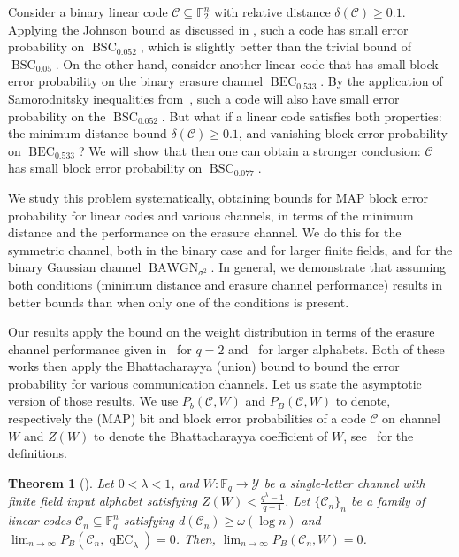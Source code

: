 \documentclass{article}
\DeclareMathOperator{\qEC}{qEC}
\DeclareMathOperator{\BEC}{BEC}
\DeclareMathOperator{\BSC}{BSC}
\DeclareMathOperator{\BAWGN}{BAWGN}
\newcommand{\cC}{\mathcal{C}}
\theoremstyle{plain}
\theoremstyle{plain}
\newtheorem{theorem}[definition]{Theorem}%
\theoremstyle{plain}
\theoremstyle{plain}
\theoremstyle{plain}
\theoremstyle{plain}
\theoremstyle{plain}
\theoremstyle{plain}
\theoremstyle{plain}
\theoremstyle{plain}
\theoremstyle{remark}
\theoremstyle{remark}
\theoremstyle{remark}
\theoremstyle{plain}
\begin{document}
Consider a binary linear code
$\mathcal{C}\subseteq\mathbb{F}_2^n$ with
relative distance $\delta(\mathcal{C})\ge 0.1$.
Applying the Johnson bound as discussed in ,
such a code has small error probability on
$\BSC_{0.052}$, which is slightly better than
the trivial bound of $\BSC_{0.05}$.
On the other hand, consider another linear code that has
small block error probability on the binary erasure
channel
$\BEC_{0.533}$. By the application of
Samorodnitsky inequalities from~\cite{hkazla2021codes}, such a code
will also have small error probability
on the $\BSC_{0.052}$.
But what if a linear code satisfies both properties: the minimum distance bound
$\delta(\mathcal{C})\ge 0.1$, and
vanishing block error probability on $\BEC_{0.533}$?
We will show that then one can obtain a stronger
conclusion: $\mathcal{C}$ has small block error
probability on $\BSC_{0.077}$.

We study this problem systematically, obtaining bounds
for MAP block error probability for linear codes
and various channels,
in terms of the minimum distance and the performance on the
erasure channel. We do this for the symmetric channel,
both in the binary case and for larger finite fields,
and for the binary Gaussian channel $\BAWGN_{\sigma^2}$.
In general, we demonstrate that assuming
both conditions
(minimum distance and erasure channel performance) results in
better bounds than when only one of the conditions is present.

Our results apply the bound on the weight
distribution in terms of the erasure channel performance given in~\cite{hkazla2021codes} for $q=2$ and~\cite{abawonse2025generalized} for larger alphabets.
Both of these works then apply the Bhattacharayya (union) bound
to bound the error probability for various communication channels. Let us state the asymptotic version of those
results. 
We use $P_b(\cC,W)$ and $P_B(\cC,W)$ 
to denote, respectively the (MAP) bit and block error
probabilities of a code $\cC$ on channel $W$
and $Z(W)$ to denote the Bhattacharayya coefficient of $W$, see~ for the definitions.
\begin{theorem}[\cite{hkazla2021codes,abawonse2025generalized}]
\label{thm:original}
Let $0<\lambda< 1$, and $W:\mathbb{F}_q\to\mathcal{Y}$ be
a single-letter channel with finite field input alphabet satisfying
$Z(W)<\frac{q^{\lambda}-1}{q-1}$. Let
$\{\cC_n\}_n$ be a family of linear codes
$\cC_n\subseteq\mathbb{F}_q^n$ satisfying
$d(\cC_n)\ge\omega(\log n)$ and 
$\lim_{n\to\infty} P_B(\cC_n,\qEC_{\lambda})=0$.
Then, 
$\lim_{n\to\infty}P_B(\cC_n,W)=0$.
\end{theorem}
\end{document}
